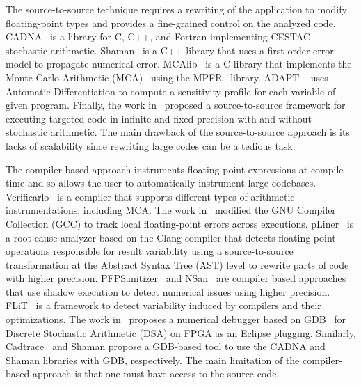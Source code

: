 \documentclass[10pt,journal,compsoc]{IEEEtran}
\DeclareRobustCommand{\add}[1]{#1}
\begin{document}
The source-to-source technique requires a rewriting of the application to modify
floating-point types and provides a fine-grained control on the analyzed code.
CADNA~\cite{jezequel2008cadna} is a library for C, C++, and Fortran implementing
CESTAC~\cite{vignes1993stochastic} stochastic arithmetic.
Shaman~\cite{demeure_phd} is a C++ library that uses a first-order error model
to propagate numerical error. MCAlib~\cite{frechtling2015mcalib} is a C library
that implements the Monte Carlo Arithmetic (MCA)~\cite{parker1997monte} using
the MPFR~\cite{fousse2007mpfr} library. \add{ADAPT \mbox{~\cite{menon2018adapt}} uses
    Automatic Differentiation to compute a sensitivity profile for each variable of
    given program}. Finally, the work in~\cite{tang2016software} proposed a
source-to-source framework for executing targeted code in infinite and fixed
precision with and without stochastic arithmetic. The main drawback of the
source-to-source approach is its lacks of scalability since rewriting large
codes can be a tedious task.


The compiler-based approach instruments floating-point expressions at compile
time and so allows the user to automatically instrument large codebases.
Verificarlo~\cite{verificarlo} is a compiler that supports different types of
arithmetic instrumentations, including MCA. The work in~\cite{bao2013fly}
modified the GNU Compiler Collection (GCC) to track local floating-point errors
across executions. pLiner~\cite{guo2020pliner} is a root-cause analyzer based on
the Clang compiler that detects floating-point operations responsible for result
variability using a source-to-source transformation at the Abstract Syntax Tree
(AST) level to rewrite parts of code with higher precision.
PFPSanitizer~\cite{chowdhary2020debugging,chowdhary2021parallel} \add{and
    NSan~\mbox{\cite{courbet2021nsan}} are compiler based approaches}
that use shadow execution to detect numerical issues using higher
precision.
FLiT~\cite{sawaya2017flit} is a framework to detect variability
induced by compilers and their optimizations. The work
in~\cite{wang2012development} proposes a numerical debugger based on
GDB~\cite{stallman1988debugging} for Discrete Stochastic Arithmetic (DSA) on
FPGA as an Eclipse plugging. Similarly, Cadtrace~\cite{jezequel2008cadna} and
Shaman propose a GDB-based tool to use the CADNA and Shaman libraries with GDB,
respectively. The main limitation of the compiler-based approach is that one
must have access to the source code.
\end{document}
